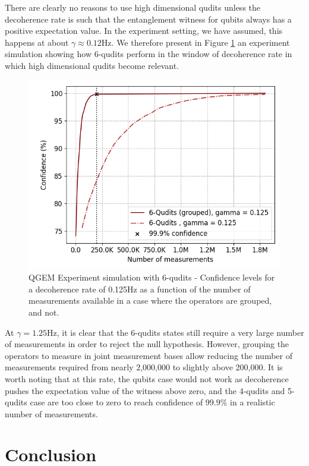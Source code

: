 \documentclass[%
 12pt,
 superscriptaddress,
 amsmath,
 amssymb,
 onecolumn,
 longbibliography
]{revtex4-2}
\begin{document}
\indent There are clearly no reasons to use high dimensional qudits unless the decoherence rate is such that the entanglement witness for qubits always has a positive expectation value. In the experiment setting, we have assumed, this happens at about $\gamma \approx 0.12$Hz. We therefore present in Figure \ref{fig:expsim_qudits_125} an experiment simulation showing how 6-qudits perform in the window of decoherence rate in which high dimensional qudits become relevant.
	\begin{figure}
    		\includegraphics[width=.5\columnwidth]{EW_confidence_6qudits_deco_125.png}\par\medskip
	    \caption{QGEM Experiment simulation with 6-qudits - Confidence levels for a decoherence rate of 0.125Hz as a function of the number of measurements available in a case where the operators are grouped, and not.} \label{fig:expsim_qudits_125}
	\end{figure} 
\indent At $\gamma = 1.25$Hz, it is clear that the 6-qudits states still require a very large number of measurements in order to reject the null hypothesis. However, grouping the operators to measure in joint measurement bases allow reducing the number of measurements required from nearly 2,000,000 to slightly above 200,000. It is worth noting that at this rate, the qubits case would not work as decoherence pushes the expectation value of the witness above zero, and the 4-qudits and 5-qudits case are too close to zero to reach confidence of $99.9\%$ in a realistic number of measurements. \\

\section{Conclusion\label{sec:conclusion}}
\end{document}
